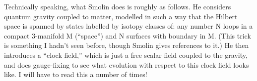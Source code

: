 Technically speaking, what Smolin does is roughly as follows. He considers quantum gravity coupled to matter, modelled in such a way that the Hilbert space is spanned by states labelled by isotopy classes of: any number N loops in a compact 3-manifold M (``space'') and N surfaces with boundary in M. (This trick is something I hadn't seen before, though Smolin gives references to it.) He then introduces a ``clock field,'' which is just a free scalar field coupled to the gravity, and does gauge-fixing to see what evolution with respect to this clock field looks like. I will have to read this a number of times!

